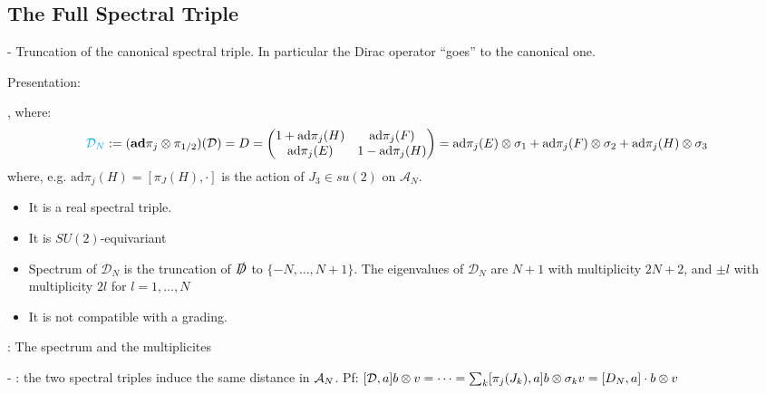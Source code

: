 \linea




\subsection{The Full Spectral Triple}

- Truncation of the canonical spectral triple. In particular the Dirac operator ``goes'' to the canonical one.

Presentation:

, where:
\begin{multline}
    \textcolor{cyan}{\mathcal D_N} := (\textbf{ad}\pi_j \otimes \pi_{1/2})(\mathcal D) = D = \begin{pmatrix} 1 + \text{ad}\pi_j(H) & \text{ad}\pi_j(F) \\ \text{ad}\pi_j(E) & 1 - \text{ad}\pi_j(H)\end{pmatrix} 
    = \text{ad}\pi_j(E) \otimes \sigma_1 + \text{ad}\pi_j(F) \otimes \sigma_2 + \text{ad}\pi_j(H) \otimes \sigma_3
\end{multline}
where, e.g. $\text{ad}\pi_j(H) = [\pi_J(H), \cdot ]$ is the action of $J_3 \in su(2)$ on $\mathcal A_N$.

    \begin{itemize}
    
    \item It is a real spectral triple.
    
    \item It is $SU(2)$-equivariant
    
    \item Spectrum of $\mathcal D_N$ is the truncation of $\slashed D$ to $\{-N, \dots, N+1\}$. The eigenvalues of $\mathcal D_N$ are $N+1$ with multiplicity $2N+2$, and $\pm l$ with multiplicity $2l$ for $l = 1, \dots, N$
    
    \item It is not compatible with a grading.
    
    \end{itemize}

: The spectrum and the multiplicites 

- : the two spectral triples induce the same distance in $\mathcal A_N$. Pf: $[\mathcal D, a]b \otimes v = \cdots = \sum_k [\pi_j(J_k), a]b \otimes \sigma_k v = [D_N, a] \cdot b \otimes v$

